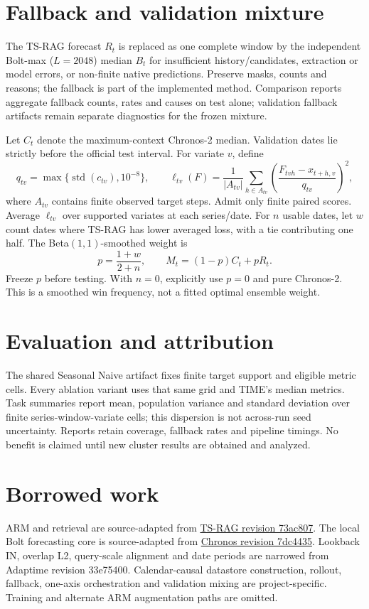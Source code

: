 \documentclass[11pt,a4paper]{article}
\begin{document}
\section{Fallback and validation mixture}
The TS-RAG forecast $R_t$ is replaced as one complete window by the independent
Bolt-max ($L=2048$) median $B_t$ for insufficient history/candidates, extraction or model
errors, or non-finite native predictions. Preserve masks,
counts and reasons; the fallback is part of the implemented method.
Comparison reports aggregate fallback counts, rates and causes on test alone;
validation fallback artifacts remain separate diagnostics for the frozen mixture.

Let $C_t$ denote the maximum-context Chronos-2 median. Validation dates lie
strictly before the official test interval. For variate $v$, define
\[
 q_{tv}=\max\{\operatorname{std}(c_{tv}),10^{-8}\},\qquad
 \ell_{tv}(F)=\frac{1}{|A_{tv}|}\sum_{h\in A_{tv}}
       \left(\frac{F_{tvh}-x_{t+h,v}}{q_{tv}}\right)^2,
\]
where $A_{tv}$ contains finite observed target steps. Admit only finite paired
scores. Average $\ell_{tv}$ over supported variates at each series/date.
For $n$ usable dates, let $w$ count dates where TS-RAG has lower averaged
loss, with a tie contributing one half. The Beta$(1,1)$-smoothed weight is
\[
 p=\frac{1+w}{2+n},\qquad M_t=(1-p)C_t+pR_t.
\]
Freeze $p$ before testing. With $n=0$, explicitly use $p=0$ and pure Chronos-2.
This is a smoothed win frequency, not a fitted optimal ensemble weight.

\section{Evaluation and attribution}
The shared Seasonal Naive artifact fixes finite target support and eligible
metric cells. Every ablation variant uses that same grid and
TIME's median metrics.
Task summaries report mean, population variance and standard deviation over
finite series-window-variate cells; this dispersion is not across-run seed
uncertainty. Reports retain coverage, fallback rates and pipeline timings.
No benefit is claimed until new cluster results are obtained and analyzed.

\section{Borrowed work}
ARM and retrieval are source-adapted from
\href{https://github.com/UConn-DSIS/TS-RAG/tree/73ac807789d2e61b8a3dfc8514e3fc947fe185cc}{TS-RAG revision 73ac807}.
The local Bolt forecasting core is source-adapted from
\href{https://github.com/amazon-science/chronos-forecasting/tree/7dc4435706a4454feb79df44ca9f33631f3027bf}{Chronos revision 7dc4435}.
Lookback IN, overlap L2, query-scale alignment and date periods are narrowed
from Adaptime revision 33e75400. Calendar-causal datastore construction, rollout,
fallback, one-axis orchestration and validation mixing are project-specific.
Training and alternate ARM augmentation paths are omitted.
\end{document}
